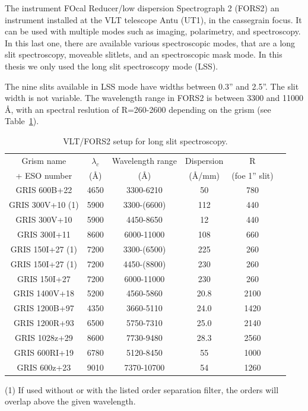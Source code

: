 The instrument FOcal Reducer/low dispersion Spectrograph 2 (FORS2) an instrument installed at the VLT telescope Antu (UT1), in the cassegrain focus. It can be used with multiple modes such as imaging, polarimetry, and spectroscopy. In this last one, there are available various spectroscopic modes, that are a long slit spectroscopy, moveable slitlets, and an spectroscopic mask mode. In this thesis we only used the long slit spectroscopy mode (LSS).

The nine slits available in LSS mode have widths between 0.3'' and 2.5''. The slit width is not variable. The wavelength range in FORS2 is between 3300 and 11000 \AA, with an spectral reslution of R=260-2600 depending on the grism (see Table~\ref{tab2:fors}).

\begin{table}
\begin{center}
\caption{VLT/FORS2 setup for long slit spectroscopy.}
\begin{tabular}{|c|c|c|c|c|c|}
\hline
Grism name  & $\lambda_c$  & Wavelength range & Dispersion & R \\
 + ESO number & (\AA)  & (\AA) & (\AA/mm)  & (foe 1'' slit) \\ \hline
GRIS 600B+22	 & 4650 & 3300-6210 & 50  &  780  \\ \hline
GRIS 300V+10 (1) & 5900 & 3300-(6600) & 112  & 	440 \\ \hline
GRIS 300V+10	 & 5900 & 4450-8650 & 12  &  440 \\ \hline
GRIS 300I+11	 & 8600 & 6000-11000 & 	108  &  660 \\ \hline
GRIS 150I+27 (1) & 7200 & 3300-(6500) & 225  & 260  \\ \hline
GRIS 150I+27 (1)	 & 7200 & 4450-(8800) & 230  &  260 \\ \hline
GRIS 150I+27	 & 7200 & 6000-11000 & 	230  &  260 \\ \hline
GRIS 1400V+18 & 5200 & 	4560-5860 & 20.8  &  2100 \\ \hline
GRIS 1200B+97 & 4350 & 	3660-5110 & 24.0  &  1420 \\ \hline
GRIS 1200R+93 & 6500 & 	5750-7310 & 25.0  & 2140  \\ \hline
GRIS 1028z+29 & 8600 & 7730-9480 & 28.3  &  2560 \\ \hline
GRIS 600RI+19 & 6780 & 5120-8450 & 55  & 1000  \\ \hline
GRIS 600z+23 & 9010 & 7370-10700 & 54  & 1260   \\ 
\hline
\end{tabular}

(1) If used without or with the listed order separation filter, the orders will overlap above the given wavelength.
\label{tab2:fors}
\end{center}	
\end{table}




